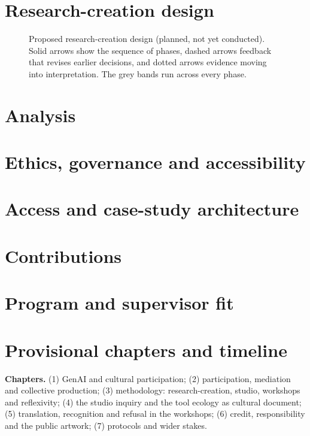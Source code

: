 \documentclass[letterpaper,11pt]{article}
\begin{document}
\section{Research-creation design}\label{sec:design}


\begin{figure}[ht]
\centering
{}

\caption{Proposed research-creation design (planned, not yet conducted).
Solid arrows show the sequence of phases, dashed arrows feedback that revises
earlier decisions, and dotted arrows evidence moving into interpretation. The
grey bands run across every phase.}
\label{fig:overview}
\end{figure}

\section{Analysis}


\section{Ethics, governance and accessibility}


\section{Access and case-study architecture}


\section{Contributions}


\section{Program and supervisor fit}


\section{Provisional chapters and timeline}

\textbf{Chapters.} (1) GenAI and cultural participation; (2) participation,
mediation and collective production; (3) methodology: research-creation,
studio, workshops and reflexivity; (4) the studio inquiry and the tool
ecology as cultural document; (5) translation, recognition and refusal in the
workshops; (6) credit, responsibility and the public artwork; (7) protocols
and wider stakes.
\end{document}

